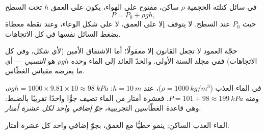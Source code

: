 \begin{theorem}\label{thm:g10:pressure:depth}
في سائل كتلته الحجمية $\rho$ ساكن، مفتوح على الهواء، يكون  على
العمق $h$ تحت السطح
\[
P = P_0 + \rho g h,
\]
حيث $P_0$  عند السطح. 
لا يتوقف إلا على العمق، لا على شكل الوعاء، وعند
نقطة معطاة يضغط السائل  نفسها في كل الاتجاهات.
\end{theorem}
\admitted

\begin{remark}
حجّة العمود لا تجعل القانون إلا معقولًا؛ أما الاشتقاق الأمين
(لأي شكل، وفي كل الاتجاهات) ففي مجلد السنة الأولى. والحدّ العائد إلى الماء
وحده $\rho g h$ هو  \emph{النسبي} --- أي ما يعرضه مقياس
 الغطّاس.
\end{remark}

\begin{example}\label{ex:g10:pressure:tenmetres}
في الماء العذب ($\rho = \qty{1000}{kg/m^3}$)، عند $h = \qty{10}{m}$:
$\rho g h = 1000 \times 9.81 \times 10 \approx \qty{98}{kPa}$، ومنه
$P = 101 + 98 \approx \qty{199}{kPa}$. فعشرة أمتار من الماء تضيف جوًّا واحدًا
تقريبًا بالضبط: وهي قاعدة الغطّاسين التجريبية، \emph{جوّ إضافي
واحد لكل عشرة أمتار}.
\end{example}

\begin{omfigure}

{\small الماء العذب الساكن: ينمو  خطيًّا مع العمق، بجوّ إضافي واحد كل عشرة أمتار.}
\end{omfigure}

